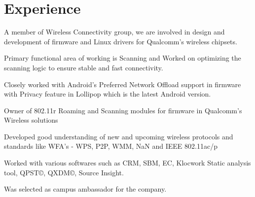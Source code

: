 \documentclass[letterpaper]{deedy-resume} %
\begin{document}
\begin{minipage}[t]{0.66\textwidth} %


\section{Experience}


\vspace{\topsep} %
\begin{tightitemize}
\item A member of Wireless Connectivity group, we are involved in design and development of firmware and Linux drivers for Qualcomm's wireless chipsets.
\item Primary functional area of working is Scanning and Worked on optimizing the scanning logic to ensure stable and fast connectivity.
\item Closely worked with Android’s Preferred Network Offload support in firmware with Privacy feature in Lollipop which is the latest Android version.
\item Owner of 802.11r Roaming and Scanning modules for firmware in Qualcomm's Wireless solutions
\item Developed good understanding of new and upcoming wireless protocols and standards like WFA's - WPS, P2P, WMM, NaN and IEEE 802.11ac/p
\end{tightitemize}

\sectionspace %



\begin{tightitemize}
\item Worked with various softwares such as CRM, SBM, EC, Klocwork Static analysis tool, QPST©, QXDM©, Source Insight.
\item Was selected as campus ambassador for the company.
\end{tightitemize}

\sectionspace %


\end{minipage}
\end{document}
